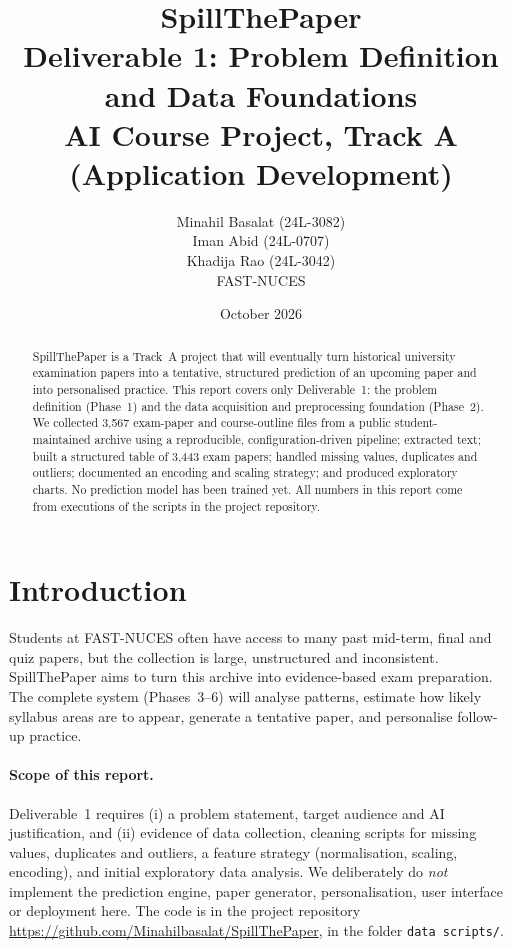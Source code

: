 \documentclass[11pt,a4paper]{article}
\title{\textbf{SpillThePaper}\\[2pt]\large Deliverable 1: Problem Definition and Data Foundations\\[2pt]\normalsize AI Course Project, Track A (Application Development)}
\author{Minahil Basalat (24L-3082)\\ Iman Abid (24L-0707)\\ Khadija Rao (24L-3042)\\[4pt] FAST-NUCES}
\date{October 2026}
\newcommand{\file}[1]{\texttt{#1}}
\begin{document}
\maketitle

\begin{abstract}
SpillThePaper is a Track~A project that will eventually turn historical university examination papers into a tentative, structured prediction of an upcoming paper and into personalised practice. This report covers only Deliverable~1: the problem definition (Phase~1) and the data acquisition and preprocessing foundation (Phase~2). We collected 3{,}567 exam-paper and course-outline files from a public student-maintained archive using a reproducible, configuration-driven pipeline; extracted text; built a structured table of 3{,}443 exam papers; handled missing values, duplicates and outliers; documented an encoding and scaling strategy; and produced exploratory charts. No prediction model has been trained yet. All numbers in this report come from executions of the scripts in the project repository.
\end{abstract}

\tableofcontents
\newpage

\section{Introduction}
Students at FAST-NUCES often have access to many past mid-term, final and quiz papers, but the collection is large, unstructured and inconsistent. SpillThePaper aims to turn this archive into evidence-based exam preparation. The complete system (Phases~3--6) will analyse patterns, estimate how likely syllabus areas are to appear, generate a tentative paper, and personalise follow-up practice.

\paragraph{Scope of this report.} Deliverable~1 requires (i) a problem statement, target audience and AI justification, and (ii) evidence of data collection, cleaning scripts for missing values, duplicates and outliers, a feature strategy (normalisation, scaling, encoding), and initial exploratory data analysis. We deliberately do \emph{not} implement the prediction engine, paper generator, personalisation, user interface or deployment here. The code is in the project repository \url{https://github.com/Minahilbasalat/SpillThePaper}, in the folder \file{data scripts/}.
\end{document}

